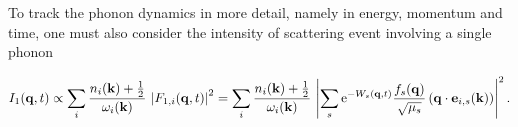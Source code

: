 To track the phonon dynamics in more detail, namely in energy, momentum and time, one must also consider the intensity of scattering event involving a single phonon

\[ I_1(\mathbf{q},t) \propto \sum_i \frac{n_i(\mathbf{k})+\frac{1}{2}}{\omega_i(\mathbf{k})}\,\left| F_{1,i}(\mathbf{q},t) \right|^2 = \sum_i \frac{n_i(\mathbf{k})+\frac{1}{2}}{\omega_i(\mathbf{k})}\,\left| \sum_s \mathrm{e}^{-W_s(\mathbf{q},t)} \frac{f_s(\mathbf{q})}{\sqrt{\mu_s}} \left( \mathbf{q}\cdot\mathbf{e}_{i, s}(\mathbf{k}) \right) \right|^2.\]

